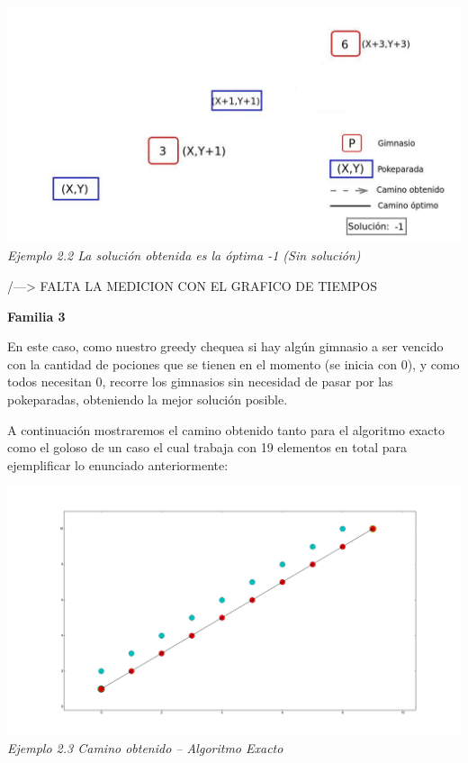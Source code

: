   \vspace*{0.3cm} \vspace*{0.3cm}
  \begin{center}
\includegraphics[scale=0.60]{./EJ2/sinSolucion1.jpeg}
\\{\textit{Ejemplo 2.2 La soluci\'on obtenida es la \'optima -1 (Sin soluci\'on)}}
  \end{center}
  \vspace*{0.3cm}


/---> FALTA LA MEDICION CON EL GRAFICO DE TIEMPOS

\begin{center}
\textbf{Familia 3}
\end{center}

En este caso, como nuestro greedy chequea si hay alg\'un gimnasio a ser vencido con la cantidad de pociones que se tienen en el momento (se inicia con 0), y como todos necesitan 0, recorre los gimnasios sin necesidad de pasar por las pokeparadas, obteniendo la mejor soluci\'on posible.

A continuaci\'on mostraremos el camino obtenido tanto para el algoritmo exacto como el goloso de un caso el cual trabaja con 19 elementos en total para ejemplificar lo enunciado anteriormente:

  \vspace*{0.3cm} \vspace*{0.3cm}
  \begin{center}
\includegraphics[scale=0.60]{./EJ2/grafotodos0.png}
\\{\textit{Ejemplo 2.3 Camino obtenido -- Algoritmo Exacto}}
  \end{center}
  \vspace*{0.3cm}

